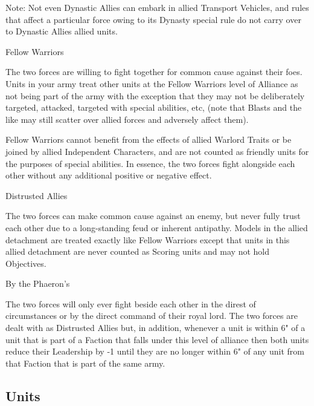 Note: Not even Dynastic Allies can embark in allied Transport Vehicles, and rules that affect a particular force owing to its Dynasty special rule do not carry over to Dynastic Allies allied units.

\noindent
\blackskull Fellow Warriors

The two forces are willing to fight together for common cause against their foes. Units in your army treat other units at the Fellow Warriors level of Alliance as not being part of the army with the exception that they may not be deliberately targeted, attacked, targeted with special abilities, etc, (note that Blasts and the like may still scatter over allied forces and adversely affect them).

Fellow Warriors cannot benefit from the effects of allied Warlord Traits or be joined by allied Independent Characters, and are not counted as friendly units for the purposes of special abilities. In essence, the two forces fight alongside each other without any additional positive or negative effect.

\noindent
\greyskull Distrusted Allies

The two forces can make common cause against an enemy, but never fully trust each other due to a long-standing feud or inherent antipathy. Models in the allied detachment are treated exactly like Fellow Warriors except that units in this allied detachment are never counted as Scoring units and may not hold Objectives.

\noindent
\redskull By the Phaeron's

The two forces will only ever fight beside each other in the direst of circumstances or by the direct command of their royal lord. The two forces are dealt with as Distrusted Allies but, in addition, whenever a unit is within 6" of a unit that is part of a Faction that falls under this level of alliance then both units reduce their Leadership by -1 until they are no longer within 6" of any unit from that Faction that is part of the same army.

\subsection{Units}

\newpage
\subsubsection[Destroyer Lord]{}

